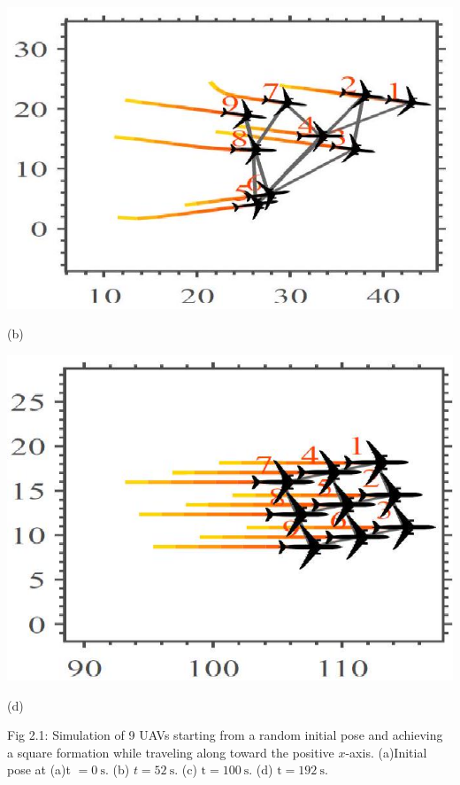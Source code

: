 \documentclass[10pt]{article}
\begin{document}
\begin{center}
\includegraphics[max width=\textwidth]{2023_10_07_53b70c7408bc8e139415g-36}
\end{center}

(b)

\begin{center}
\includegraphics[max width=\textwidth]{2023_10_07_53b70c7408bc8e139415g-36(1)}
\end{center}

(d)

Fig 2.1: Simulation of 9 UAVs starting from a random initial pose and achieving a square formation while traveling along toward the positive $x$-axis. (a)Initial pose at (a)t $=0 \mathrm{~s}$. (b) $t=52 \mathrm{~s}$. (c) $\mathrm{t}=100 \mathrm{~s}$. (d) $\mathrm{t}=192 \mathrm{~s}$.
\end{document}
